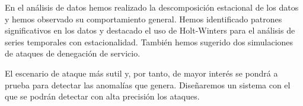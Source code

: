 En el análisis de datos hemos realizado la descomposición estacional de los datos y hemos observado su comportamiento general. Hemos identificado patrones significativos en los datos y destacado el uso de Holt-Winters para el análisis de series temporales con estacionalidad. 
También hemos sugerido dos simulaciones de ataques de denegación de servicio.

El escenario de ataque más sutil y, por tanto, de mayor interés se pondrá a prueba para detectar las anomalías que genera. Diseñaremos un sistema con el que se podrán detectar con alta precisión los ataques.
